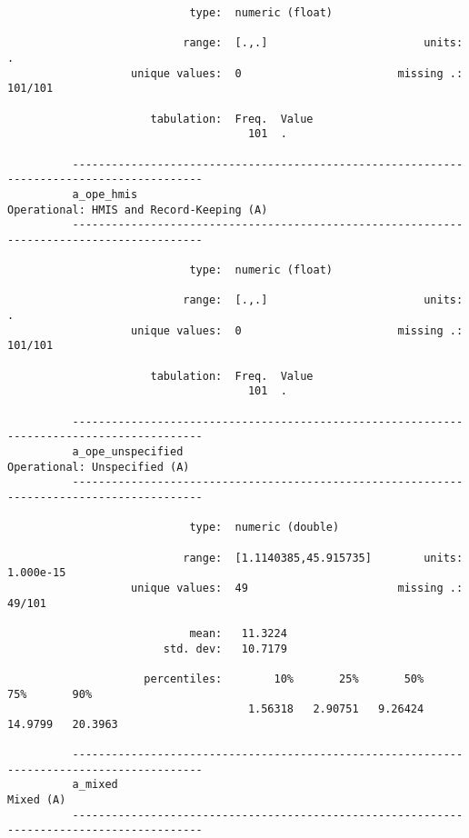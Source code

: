 \documentclass{article}
\begin{document}
\begin{verbatim}
                            type:  numeric (float)
          
                           range:  [.,.]                        units:  .
                   unique values:  0                        missing .:  101/101
          
                      tabulation:  Freq.  Value
                                     101  .
          
          ------------------------------------------------------------------------------------------
          a_ope_hmis                                        Operational: HMIS and Record-Keeping (A)
          ------------------------------------------------------------------------------------------
          
                            type:  numeric (float)
          
                           range:  [.,.]                        units:  .
                   unique values:  0                        missing .:  101/101
          
                      tabulation:  Freq.  Value
                                     101  .
          
          ------------------------------------------------------------------------------------------
          a_ope_unspecified                                             Operational: Unspecified (A)
          ------------------------------------------------------------------------------------------
          
                            type:  numeric (double)
          
                           range:  [1.1140385,45.915735]        units:  1.000e-15
                   unique values:  49                       missing .:  49/101
          
                            mean:   11.3224
                        std. dev:   10.7179
          
                     percentiles:        10%       25%       50%       75%       90%
                                     1.56318   2.90751   9.26424   14.9799   20.3963
          
          ------------------------------------------------------------------------------------------
          a_mixed                                                                          Mixed (A)
          ------------------------------------------------------------------------------------------
          

\end{verbatim}
\end{document}
